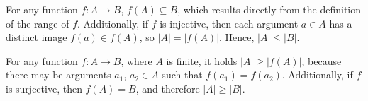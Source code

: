 \exercise
\subexercise
For any function $f:A\to B$, $f(A)\subseteq B$, which results directly from the definition of the range of $f$\!.
Additionally, if $f$ is injective, then each argument $a\in A$ has a distinct image $f(a)\in f(A)$, so $|A|=|f(A)|$.
Hence, $|A|\le|B|$.

\subexercise
For any function $f:A\to B$, where $A$ is finite, it holds $|A|\ge|f(A)|$, because there may be arguments $a_1$, $a_2\in A$ such that $f(a_1)=f(a_2)$.
Additionally, if $f$ is surjective, then $f(A)=B$, and therefore $|A|\ge|B|$.
